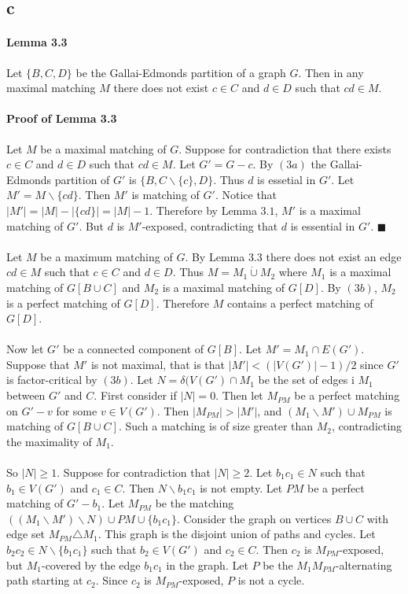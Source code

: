 \documentclass[letterpaper,12pt,oneside,onecolumn]{report}
\begin{document}
\subsection*{c}
\paragraph{Lemma 3.3}
Let $\{B,C,D\}$ be the Gallai-Edmonds partition of a graph $G$. Then in any maximal matching $M$ there does not exist $c\in C$ and $d \in D$ such that $cd \in M$. 
\paragraph{Proof of Lemma 3.3}
Let $M$ be a maximal matching of $G$. Suppose for contradiction that there exists $c \in C$ and $d \in D$ such that $cd \in M$. Let $G' = G - c$. By $(3a)$ the Gallai-Edmonds partition of $G'$ is $\{B,C\backslash \{c\}, D\}$. Thus $d$ is essetial in $G'$. Let $M' = M \backslash \{cd\}$. Then $M'$ is matching of $G'$. Notice that $|M'| = |M| - |\{cd\}| = |M| - 1$. Therefore by Lemma $3.1$, $M'$ is a maximal matching of $G'$. But $d$ is $M'$-exposed, contradicting that $d$ is essential in $G'$. $\blacksquare$
\paragraph{}
Let $M$ be a maximum matching of $G$. By Lemma $3.3$ there does not exist an edge $cd \in M$ such that $c \in C$ and $d \in D$.  Thus $M = M_1 \dot \cup M_2$ where $M_1$ is a maximal matching of $G[B \cup C]$ and $M_2$ is a maximal matching of $G[D]$. By $(3b)$, $M_2$ is a perfect matching of $G[D]$. Therefore $M$ contains a perfect matching of $G[D]$.
\paragraph{}
Now let $G'$ be a connected component of $G[B]$. Let $M' = M_1 \cap E(G')$. Suppose that $M'$ is not maximal, that is that $|M'| < (|V(G')| - 1)/2$ since $G'$ is factor-critical by $(3b)$. Let $N = \delta(V(G') \cap M_1$ be the set of edges i $M_1$ between $G'$ and $C$. First consider if $|N| = 0$. Then let $M_{PM}$ be a perfect matching on $G' - v$ for some $v \in V(G')$. Then $|M_{PM}| > |M'|$, and $(M_1 \backslash M') \cup M_{PM}$ is matching of $G[B \cup C]$. Such a matching is of size greater than $M_2$, contradicting the maximality of $M_1$.
\paragraph{}
So $|N| \geq 1$. Suppose for contradiction that $|N| \geq 2$. Let $b_1c_1 \in N$ such that $b_1 \in V(G')$ and $c_1 \in C$. Then $N \backslash {b_1c_1}$ is not empty. Let $PM$ be a perfect matching of $G' - b_1$. Let $M_{PM}$ be the matching $((M_1 \backslash M')\backslash N) \cup PM \cup \{b_1c_1\}$. Consider the graph on vertices $B \cup C$ with edge set $M_{PM} \triangle M_1$. This graph is the disjoint union of paths and cycles. Let $b_2c_2 \in N\backslash \{b_1c_1\}$ such that $b_2 \in V(G')$ and $c_2 \in C$. Then $c_2$ is $M_{PM}$-exposed, but $M_1$-covered by the edge $b_1c_1$ in the graph. Let $P$ be the $M_1M_{PM}$-alternating path starting at $c_2$. Since $c_2$ is $M_{PM}$-exposed, $P$ is not a cycle.
\end{document}
